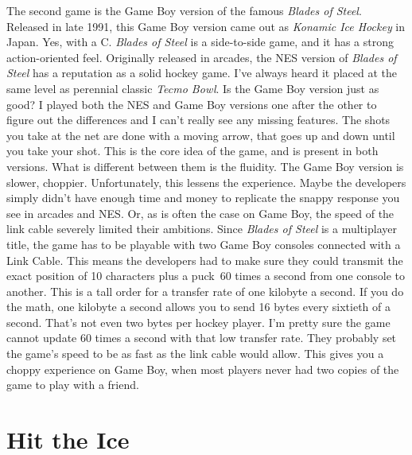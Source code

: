 \documentclass{book}
\let\oldcenter\center
\let\oldendcenter\endcenter
\renewenvironment{center}{\setlength\topsep{0pt}\oldcenter}{\oldendcenter}
\begin{document}
\begin{center}
\vspace{8pt}
\quad\vspace{4pt}
\end{center}

The second game is the Game Boy version of the famous \emph{Blades of Steel}. Released in late 1991, this Game Boy version came out as \emph{Konamic Ice Hockey} in Japan. Yes, with a C. \emph{Blades of Steel} is a side-to-side game, and it has a strong action-oriented feel. Originally released in arcades, the NES version of \emph{Blades of Steel} has a reputation as a solid hockey game. I’ve always heard it placed at the same level as perennial classic \emph{Tecmo Bowl}. Is the Game Boy version just as good? I played both the NES and Game Boy versions one after the other to figure out the differences and I can’t really see any missing features. The shots you take at the net are done with a moving arrow, that goes up and down until you take your shot. This is the core idea of the game, and is present in both versions. What is different between them is the fluidity. The Game Boy version is slower, choppier. Unfortunately, this lessens the experience. Maybe the developers simply didn’t have enough time and money to replicate the snappy response you see in arcades and NES. Or, as is often the case on Game Boy, the speed of the link cable severely limited their ambitions. Since \emph{Blades of Steel} is a multiplayer title, the game has to be playable with two Game Boy consoles connected with a Link Cable. This means the developers had to make sure they could transmit the exact position of 10 characters plus a puck 60 times a second from one console to another. This is a tall order for a transfer rate of one kilobyte a second. If you do the math, one kilobyte a second allows you to send 16 bytes every sixtieth of a second. That’s not even two bytes per hockey player. I’m pretty sure the game cannot update 60 times a second with that low transfer rate. They probably set the game’s speed to be as fast as the link cable would allow. This gives you a choppy experience on Game Boy, when most players never had two copies of the game to play with a friend.

\FloatBarrier\needspace{10mm}\section*{Hit the Ice}\nopagebreak[4]
\end{document}
